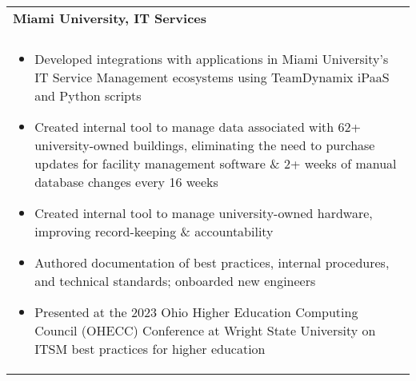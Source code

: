 \documentclass[letterpaper,10pt]{article} %
\begin{document}
\begin{tabular*}{\linewidth}{@{\extracolsep{\fill}} lr }
\textbf{Miami University, IT Services} & \scriptsize\bfseries\color{sectioncolour}{Oxford, OH}\\
\footnotesize\bfseries\color{sectioncolour}{Software Engineer Intern} & \scriptsize\bfseries\color{sectioncolour}{May 2022 - May 2024}\\
\multicolumn{2}{p{\linewidth}}{
    \scriptsize{\vspace{-0.1in}\begin{itemize}
        \item Developed integrations with applications in Miami University's IT Service Management ecosystems using TeamDynamix iPaaS and Python scripts
        \item Created internal tool to manage data associated with 62+ university-owned buildings, eliminating the need to purchase updates for facility management software \& 2+ weeks of manual database changes every 16 weeks
        \item Created internal tool to manage university-owned hardware, improving record-keeping \& accountability
        \item Authored documentation of best practices, internal procedures, and technical standards; onboarded new engineers
        \item Presented at the 2023 Ohio Higher Education Computing Council (OHECC) Conference at Wright State University on ITSM best practices for higher education
    \end{itemize}\vspace{-0.0in}}
}\\


\end{tabular*}
\end{document}
